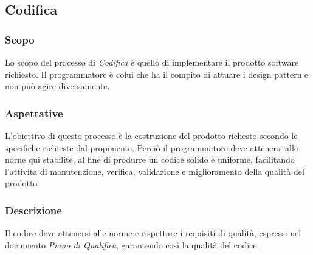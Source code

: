 	\subsection{Codifica}
		\subsubsection{Scopo}
		Lo scopo del processo di \textit{Codifica} è quello di implementare il prodotto software richiesto. Il programmatore è colui che ha il compito di attuare i design pattern e non può agire diversamente.
		\subsubsection{Aspettative}
		L'obiettivo di questo processo è la costruzione del prodotto richesto secondo le specifiche richieste dal proponente. Perciò il programmatore deve attenersi alle norne qui stabilite, al fine di produrre un codice solido e uniforme, facilitando l'attivita di manutenzione, verifica, validazione e miglioramento della qualità del prodotto.
		\subsubsection{Descrizione}
		Il codice deve attenersi alle norme e rispettare i requisiti di qualità, espressi nel documento \textit{Piano di Qualifica}, garantendo così la qualità del codice.
